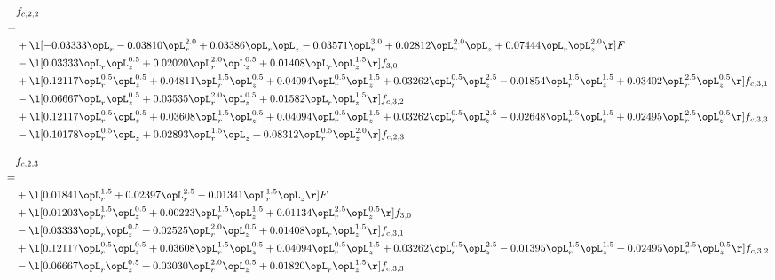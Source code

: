 \begin{alignat}{2} 
\label{eq:f_22_2} 
& f_{c,2,2} \nonumber \\ 
 = \\ 
& + \l[  -0.03333 \opL_r   -0.03810 \opL_r^{2.0} +  0.03386 \opL_r \opL_z   -0.03571 \opL_r^{3.0} +  0.02812 \opL_r^{2.0} \opL_z +  0.07444 \opL_r \opL_z^{2.0}  \r] F \nonumber \\ 
& - \l[  0.03333 \opL_r \opL_z^{0.5} +  0.02020 \opL_r^{2.0} \opL_z^{0.5} +  0.01408 \opL_r \opL_z^{1.5}  \r] f_{3,0} \nonumber \\ 
& + \l[  0.12117 \opL_r^{0.5} \opL_z^{0.5} +  0.04811 \opL_r^{1.5} \opL_z^{0.5} +  0.04094 \opL_r^{0.5} \opL_z^{1.5} +  0.03262 \opL_r^{0.5} \opL_z^{2.5}   -0.01854 \opL_r^{1.5} \opL_z^{1.5} +  0.03402 \opL_r^{2.5} \opL_z^{0.5}  \r] f_{c,3,1} \nonumber \\ 
& - \l[  0.06667 \opL_r \opL_z^{0.5} +  0.03535 \opL_r^{2.0} \opL_z^{0.5} +  0.01582 \opL_r \opL_z^{1.5}  \r] f_{c,3,2} \nonumber \\ 
& + \l[  0.12117 \opL_r^{0.5} \opL_z^{0.5} +  0.03608 \opL_r^{1.5} \opL_z^{0.5} +  0.04094 \opL_r^{0.5} \opL_z^{1.5} +  0.03262 \opL_r^{0.5} \opL_z^{2.5}   -0.02648 \opL_r^{1.5} \opL_z^{1.5} +  0.02495 \opL_r^{2.5} \opL_z^{0.5}  \r] f_{c,3,3} \nonumber \\ 
& - \l[  0.10178 \opL_r^{0.5} \opL_z +  0.02893 \opL_r^{1.5} \opL_z +  0.08312 \opL_r^{0.5} \opL_z^{2.0}  \r] f_{c,2,3} \nonumber \\ 
\end{alignat} 


\begin{alignat}{2} 
\label{eq:f_23_2} 
& f_{c,2,3} \nonumber \\ 
 = \\ 
& + \l[  0.01841 \opL_r^{1.5} +  0.02397 \opL_r^{2.5}   -0.01341 \opL_r^{1.5} \opL_z  \r] F \nonumber \\ 
& + \l[  0.01203 \opL_r^{1.5} \opL_z^{0.5} +  0.00223 \opL_r^{1.5} \opL_z^{1.5} +  0.01134 \opL_r^{2.5} \opL_z^{0.5}  \r] f_{3,0} \nonumber \\ 
& - \l[  0.03333 \opL_r \opL_z^{0.5} +  0.02525 \opL_r^{2.0} \opL_z^{0.5} +  0.01408 \opL_r \opL_z^{1.5}  \r] f_{c,3,1} \nonumber \\ 
& + \l[  0.12117 \opL_r^{0.5} \opL_z^{0.5} +  0.03608 \opL_r^{1.5} \opL_z^{0.5} +  0.04094 \opL_r^{0.5} \opL_z^{1.5} +  0.03262 \opL_r^{0.5} \opL_z^{2.5}   -0.01395 \opL_r^{1.5} \opL_z^{1.5} +  0.02495 \opL_r^{2.5} \opL_z^{0.5}  \r] f_{c,3,2} \nonumber \\ 
& - \l[  0.06667 \opL_r \opL_z^{0.5} +  0.03030 \opL_r^{2.0} \opL_z^{0.5} +  0.01820 \opL_r \opL_z^{1.5}  \r] f_{c,3,3} \nonumber \\ 
\end{alignat} 


